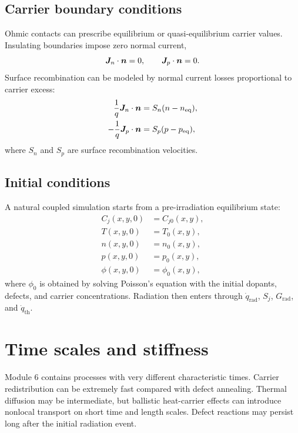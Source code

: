 \documentclass[11pt]{article}
\newcommand{\Jvec}{\bm{J}}
\begin{document}
\subsection{Carrier boundary conditions}

Ohmic contacts can prescribe equilibrium or quasi-equilibrium carrier values. Insulating boundaries impose zero normal current,
\begin{equation}
\Jvec_n\cdot\nvec=0,
\qquad
\Jvec_p\cdot\nvec=0.
\end{equation}
Surface recombination can be modeled by normal current losses proportional to carrier excess:
\begin{align}
\frac{1}{q}\Jvec_n\cdot\nvec &= S_n(n-n_{\mathrm{eq}}), \\
-
\frac{1}{q}\Jvec_p\cdot\nvec &= S_p(p-p_{\mathrm{eq}}),
\end{align}
where \(S_n\) and \(S_p\) are surface recombination velocities.

\subsection{Initial conditions}

A natural coupled simulation starts from a pre-irradiation equilibrium state:
\begin{align}
C_j(x,y,0)&=C_{j0}(x,y), \\
T(x,y,0)&=T_0(x,y), \\
n(x,y,0)&=n_0(x,y), \\
p(x,y,0)&=p_0(x,y), \\
\phi(x,y,0)&=\phi_0(x,y),
\end{align}
where \(\phi_0\) is obtained by solving Poisson's equation with the initial dopants, defects, and carrier concentrations. Radiation then enters through \(\dot{q}_{\mathrm{rad}}\), \(S_j\), \(G_{\mathrm{rad}}\), and \(\dot{q}_{\mathrm{th}}\).

\section{Time scales and stiffness}

Module 6 contains processes with very different characteristic times. Carrier redistribution can be extremely fast compared with defect annealing. Thermal diffusion may be intermediate, but ballistic heat-carrier effects can introduce nonlocal transport on short time and length scales. Defect reactions may persist long after the initial radiation event.
\end{document}
